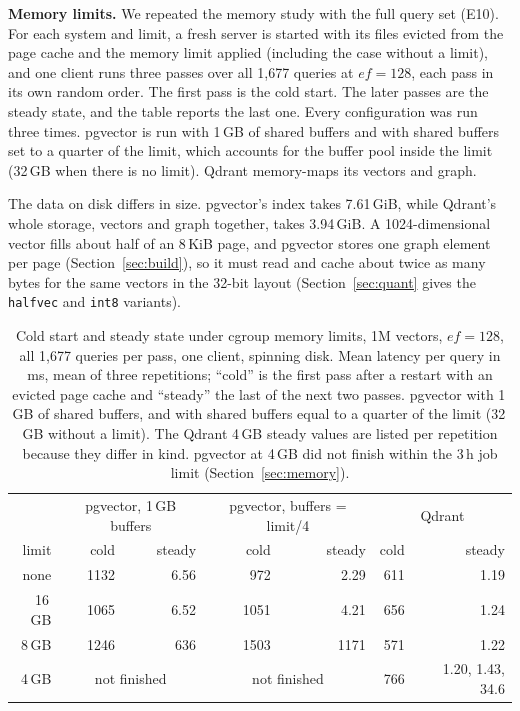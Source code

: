 \documentclass[sigconf, nonacm]{acmart}
\begin{document}
\textbf{Memory limits.} We repeated the memory study with the full query set (E10). For each
system and limit, a fresh server is started with its files evicted from the page cache and
the memory limit applied (including the case without a limit), and one client runs three
passes over all 1{,}677 queries at $ef=128$, each pass in its own random order. The first
pass is the cold start. The later passes are the steady state, and the table reports the
last one. Every configuration was run three times. pgvector is run with 1\,GB of shared
buffers and with shared buffers set to a quarter of the limit, which accounts for the
buffer pool inside the limit (32\,GB when there is no limit). Qdrant memory-maps its
vectors and graph.

The data on disk differs in size. pgvector's index takes 7.61\,GiB, while Qdrant's whole
storage, vectors and graph together, takes 3.94\,GiB. A 1024-dimensional vector fills about
half of an 8\,KiB page, and pgvector stores one graph element per page
(Section~\ref{sec:build}), so it must read and cache about twice as many bytes for the same
vectors in the 32-bit layout (Section~\ref{sec:quant} gives the \texttt{halfvec} and \texttt{int8} variants).

\begin{table}[t]
  \caption{Cold start and steady state under cgroup memory limits, 1M vectors, $ef=128$,
  all 1{,}677 queries per pass, one client, spinning disk. Mean latency per query in ms,
  mean of three repetitions; ``cold'' is the first pass after a restart with an evicted page
  cache and ``steady'' the last of the next two passes. pgvector with 1\,GB of shared
  buffers, and with shared buffers equal to a quarter of the limit (32\,GB without a limit).
  The Qdrant 4\,GB steady values are listed per repetition because they differ in kind.
  pgvector at 4\,GB did not finish within the 3\,h job limit (Section~\ref{sec:memory}).}
  \label{tab:caps}
  \small
  \begin{tabular}{r|rr|rr|rr}
    \toprule
     & \multicolumn{2}{c|}{pgvector, 1\,GB buffers} & \multicolumn{2}{c|}{pgvector, buffers = limit/4}
     & \multicolumn{2}{c}{Qdrant} \\
    limit & cold & steady & cold & steady & cold & steady \\
    \midrule
    none & 1132 & 6.56 & 972 & 2.29 & 611 & 1.19 \\
    16\,GB & 1065 & 6.52 & 1051 & 4.21 & 656 & 1.24 \\
    8\,GB & 1246 & 636 & 1503 & 1171 & 571 & 1.22 \\
    4\,GB & \multicolumn{2}{c|}{not finished} & \multicolumn{2}{c|}{not finished} & 766 & 1.20, 1.43, 34.6 \\
    \bottomrule
  \end{tabular}
\end{table}
\end{document}
